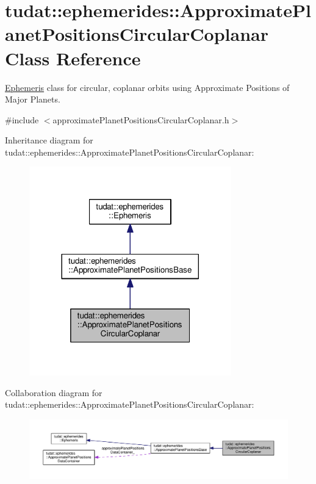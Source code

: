 \hypertarget{classtudat_1_1ephemerides_1_1ApproximatePlanetPositionsCircularCoplanar}{}\section{tudat\+:\+:ephemerides\+:\+:Approximate\+Planet\+Positions\+Circular\+Coplanar Class Reference}
\label{classtudat_1_1ephemerides_1_1ApproximatePlanetPositionsCircularCoplanar}


\hyperlink{classtudat_1_1ephemerides_1_1Ephemeris}{Ephemeris} class for circular, coplanar orbits using Approximate Positions of Major Planets.  




{\ttfamily \#include $<$approximate\+Planet\+Positions\+Circular\+Coplanar.\+h$>$}



Inheritance diagram for tudat\+:\+:ephemerides\+:\+:Approximate\+Planet\+Positions\+Circular\+Coplanar\+:
\nopagebreak
\begin{figure}[H]
\begin{center}
\leavevmode
\includegraphics[width=248pt]{classtudat_1_1ephemerides_1_1ApproximatePlanetPositionsCircularCoplanar__inherit__graph}
\end{center}
\end{figure}


Collaboration diagram for tudat\+:\+:ephemerides\+:\+:Approximate\+Planet\+Positions\+Circular\+Coplanar\+:
\nopagebreak
\begin{figure}[H]
\begin{center}
\leavevmode
\includegraphics[width=350pt]{classtudat_1_1ephemerides_1_1ApproximatePlanetPositionsCircularCoplanar__coll__graph}
\end{center}
\end{figure}
